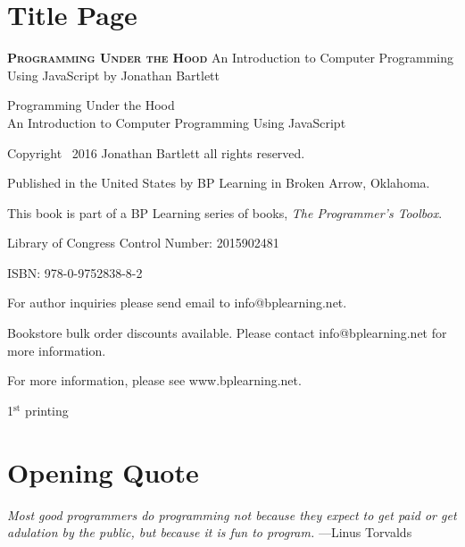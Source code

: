 \chapter*{Title Page}
{\LARGE \textsc{\textbf{Programming Under the Hood}}}
\baselineskip
{\Large An Introduction to Computer Programming Using JavaScript}
\baselineskip
{\Large by Jonathan Bartlett}
\baselineskip
{\small
Programming Under the Hood \\
An Introduction to Computer Programming Using JavaScript

Copyright \textcopyright\ 2016 Jonathan Bartlett all rights reserved.

Published in the United States by BP Learning in Broken Arrow, Oklahoma.

This book is part of a BP Learning series of books, \textit{The Programmer's Toolbox}.

Library of Congress Control Number: 2015902481

ISBN: 978-0-9752838-8-2

For author inquiries please send email to info@bplearning.net.  

Bookstore bulk order discounts available.  Please contact info@bplearning.net for more information.

For more information, please see www.bplearning.net.

1$^{\textrm{st}}$ printing
}

\chapter*{Opening Quote}
\begin{center}
\textit{Most good programmers do programming not because they expect to get paid or get adulation by the public, but because it is fun to program.}
\newline
\newline
---Linus Torvalds
\end{center}
